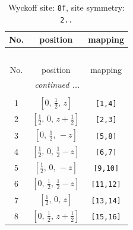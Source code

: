 \documentclass[fleqn,8pt]{jsarticle}
\begin{document}
\begin{longtable}{ccc}
\caption{Wyckoff site: {\tt 8f}, site symmetry: {\tt 2..}}
 \\
 \hline \hline
No. & position & mapping \\ \hline \endfirsthead

\multicolumn{2}{l}{\tablename\ \thetable{}} \\
 \hline \hline
No. & position & mapping \\ \hline \endhead

 \hline \hline
\multicolumn{2}{r}{\footnotesize\it continued ...} \\ \endfoot

 \hline \hline
\multicolumn{2}{r}{} \\ \endlastfoot

1 & $\left[ 0,\, \frac{1}{2},\, z \right]$ & {\tt [1,4]} \\ \hline
2 & $\left[ \frac{1}{2},\, 0,\, z + \frac{1}{2} \right]$ & {\tt [2,3]} \\ \hline
3 & $\left[ 0,\, \frac{1}{2},\, - z \right]$ & {\tt [5,8]} \\ \hline
4 & $\left[ \frac{1}{2},\, 0,\, \frac{1}{2} - z \right]$ & {\tt [6,7]} \\ \hline
5 & $\left[ \frac{1}{2},\, 0,\, - z \right]$ & {\tt [9,10]} \\ \hline
6 & $\left[ 0,\, \frac{1}{2},\, \frac{1}{2} - z \right]$ & {\tt [11,12]} \\ \hline
7 & $\left[ \frac{1}{2},\, 0,\, z \right]$ & {\tt [13,14]} \\ \hline
8 & $\left[ 0,\, \frac{1}{2},\, z + \frac{1}{2} \right]$ & {\tt [15,16]} \\
\end{longtable}
\renewcommand{\arraystretch}{1.2}
\end{document}
